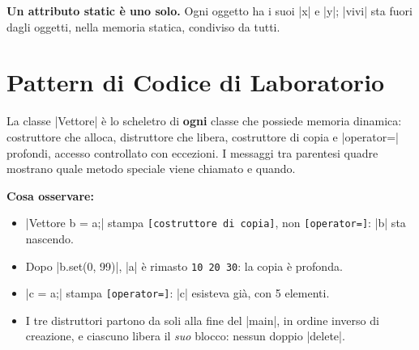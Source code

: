 \needspace{6cm}
\textbf{Un attributo static è uno solo.} Ogni oggetto ha i suoi \cc|x| e \cc|y|;
\cc|vivi| sta fuori dagli oggetti, nella memoria statica, condiviso da tutti.
\begin{center}
\end{center}

\section{Pattern di Codice di Laboratorio}

La classe \cc|Vettore| è lo scheletro di \textbf{ogni} classe che possiede memoria
dinamica: costruttore che alloca, distruttore che libera, costruttore di copia e
\cc|operator=| profondi, accesso controllato con eccezioni. I messaggi tra
parentesi quadre mostrano quale metodo speciale viene chiamato e quando.


\textbf{Cosa osservare:}
\begin{itemize}
  \item \cc|Vettore b = a;| stampa \texttt{[costruttore di copia]}, non
        \texttt{[operator=]}: \cc|b| sta nascendo.
  \item Dopo \cc|b.set(0, 99)|, \cc|a| è rimasto \texttt{10 20 30}: la copia è
        profonda.
  \item \cc|c = a;| stampa \texttt{[operator=]}: \cc|c| esisteva già, con 5 elementi.
  \item I tre distruttori partono da soli alla fine del \cc|main|, in ordine inverso
        di creazione, e ciascuno libera il \emph{suo} blocco: nessun doppio \cc|delete|.
\end{itemize}

